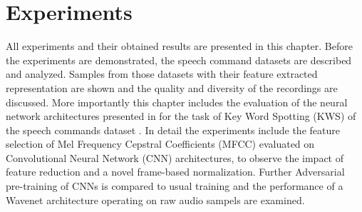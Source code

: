 
\chapter{Experiments}\label{sec:exp}
All experiments and their obtained results are presented in this chapter.
Before the experiments are demonstrated, the speech command datasets are described and analyzed.
Samples from those datasets with their feature extracted representation are shown and the quality and diversity of the recordings are discussed.
More importantly this chapter includes the evaluation of the neural network architectures presented in  for the task of Key Word Spotting (KWS) of the speech commands dataset \cite{Warden2018}.
In detail the experiments include the feature selection of Mel Frequency Cepstral Coefficients (MFCC) evaluated on Convolutional Neural Network (CNN) architectures, to observe the impact of feature reduction and a novel frame-based normalization.
Further Adversarial pre-training of CNNs is compared to usual training and the performance of a Wavenet architecture operating on raw audio sampels are examined.







